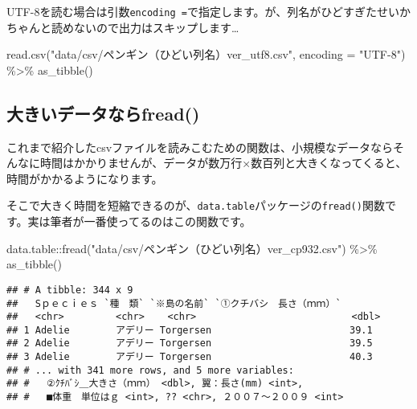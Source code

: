 \documentclass[
  xelatex,ja=standard, b5paper]{bxjsbook}
\newenvironment{Shaded}{\begin{snugshade}}{\end{snugshade}}
\newcommand{\AttributeTok}[1]{\textcolor[rgb]{0.77,0.63,0.00}{#1}}
\newcommand{\FunctionTok}[1]{\textcolor[rgb]{0.00,0.00,0.00}{#1}}
\newcommand{\NormalTok}[1]{#1}
\newcommand{\SpecialCharTok}[1]{\textcolor[rgb]{0.00,0.00,0.00}{#1}}
\newcommand{\StringTok}[1]{\textcolor[rgb]{0.31,0.60,0.02}{#1}}
\begin{document}
UTF-8を読む場合は引数\texttt{encoding\ =}で指定します。が、列名がひどすぎたせいかちゃんと読めないので出力はスキップします\ldots{}

\begin{Shaded}
\begin{Highlighting}[]
\FunctionTok{read.csv}\NormalTok{(}\StringTok{"data/csv/ペンギン（ひどい列名）ver\_utf8.csv"}\NormalTok{, }
         \AttributeTok{encoding =} \StringTok{"UTF{-}8"}\NormalTok{) }\SpecialCharTok{\%\textgreater{}\%} 
    \FunctionTok{as\_tibble}\NormalTok{()}
\end{Highlighting}
\end{Shaded}

\hypertarget{ux5927ux304dux3044ux30c7ux30fcux30bfux306aux3089fread}{%
\subsection{大きいデータならfread()}\label{ux5927ux304dux3044ux30c7ux30fcux30bfux306aux3089fread}}

これまで紹介したcsvファイルを読みこむための関数は、小規模なデータならそんなに時間はかかりませんが、データが数万行×数百列と大きくなってくると、時間がかかるようになります。

そこで大きく時間を短縮できるのが、\texttt{data.table}パッケージの\texttt{fread()}関数です。実は筆者が一番使ってるのはこの関数です。

\begin{Shaded}
\begin{Highlighting}[]
\NormalTok{data.table}\SpecialCharTok{::}\FunctionTok{fread}\NormalTok{(}\StringTok{"data/csv/ペンギン（ひどい列名）ver\_cp932.csv"}\NormalTok{) }\SpecialCharTok{\%\textgreater{}\%} 
  \FunctionTok{as\_tibble}\NormalTok{()}
\end{Highlighting}
\end{Shaded}

\begin{verbatim}
## # A tibble: 344 x 9
##   Sｐｅｃｉｅｓ `種　類` `※島の名前` `①クチバシ　長さ（ｍｍ）`
##   <chr>         <chr>    <chr>                           <dbl>
## 1 Adelie        アデリー Torgersen                        39.1
## 2 Adelie        アデリー Torgersen                        39.5
## 3 Adelie        アデリー Torgersen                        40.3
## # ... with 341 more rows, and 5 more variables:
## #   ②ｸﾁﾊﾞｼ＿大きさ（ｍｍ） <dbl>, 翼：長さ(mm) <int>,
## #   ■体重　単位はｇ <int>, ?? <chr>, ２００７～２００９ <int>
\end{verbatim}
\end{document}
